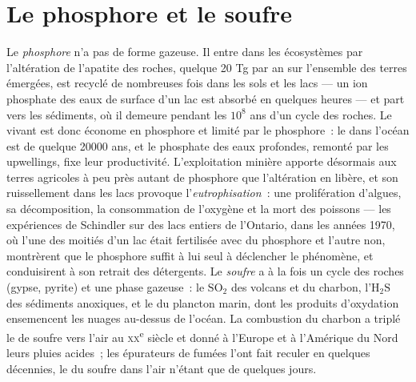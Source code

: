 \section{Le phosphore et le soufre}

\begin{proposition}\label{prop:b2:biogeochemical-cycles:ps}
Le \emph{phosphore} n'a pas de forme gazeuse. Il entre dans les
écosystèmes par l'altération de l'apatite des roches, quelque 20 Tg par
an sur l'ensemble des terres émergées, est recyclé de nombreuses fois dans
les sols et les lacs
--- un ion phosphate des eaux de surface d'un lac est absorbé en quelques
heures --- et part vers les sédiments, où il demeure pendant les
$10^{8}$ ans d'un cycle des roches. Le vivant est donc économe en
phosphore et limité par le phosphore~: le  dans l'océan
est de quelque
\num{20000} ans, et le phosphate des eaux profondes, remonté par les
upwellings, fixe leur productivité. L'exploitation minière apporte
désormais aux terres agricoles à peu près autant de phosphore que
l'altération en libère, et son ruissellement dans les lacs provoque
l'\emph{eutrophisation}~: une prolifération d'algues, sa décomposition, la
consommation de l'oxygène et la mort des poissons --- les expériences de
Schindler sur des lacs entiers de l'Ontario, dans les années 1970, où l'une
des moitiés d'un lac était fertilisée avec du phosphore et l'autre non,
montrèrent que le phosphore suffit à lui seul à déclencher le phénomène,
et conduisirent à son retrait des détergents.
Le \emph{soufre} a à la fois un cycle des roches (gypse, pyrite) et une
phase gazeuse~: le $\mathrm{SO_2}$ des volcans et du charbon, l'$\mathrm{H_2S}$ des
sédiments anoxiques, et le \emph{} du plancton marin,
dont les produits d'oxydation ensemencent les nuages au-dessus de l'océan.
La combustion du charbon a triplé le  de soufre vers l'air au
\textsc{xx}\textsuperscript{e} siècle et donné à l'Europe et à l'Amérique du Nord
leurs pluies acides~; les épurateurs de fumées l'ont fait reculer en
quelques décennies, le  du soufre dans l'air n'étant
que de quelques jours.
\end{proposition}

